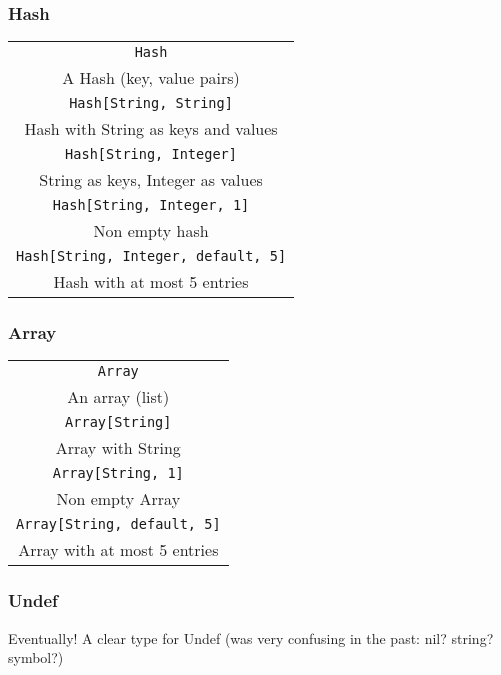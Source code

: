 \begin{frame}\frametitle{Hash}
    \begin{table}
        \begin{tabular}{c}
\texttt{Hash} \\ A Hash (key, value pairs)
\vspace{4mm} \\\pause
            \texttt{Hash[String, String]} \\ Hash with String as keys and values
\vspace{4mm} \\\pause
            \texttt{Hash[String, Integer]} \\ String as keys, Integer as values
\vspace{4mm} \\\pause
            \texttt{Hash[String, Integer, 1]} \\ Non empty hash
\vspace{4mm} \\\pause
            \texttt{Hash[String, Integer, default, 5]} \\ Hash with at most 5 entries
\end{tabular}
    \end{table}
\end{frame}
\begin{frame}\frametitle{Array}
    \begin{table}
        \begin{tabular}{c}
            \texttt{Array} \\ An array (list)
\vspace{4mm} \\\pause
            \texttt{Array[String]} \\ Array with String
\vspace{4mm} \\\pause
            \texttt{Array[String, 1]} \\ Non empty Array
\vspace{4mm} \\\pause
            \texttt{Array[String, default, 5]} \\ Array with at most 5 entries
\end{tabular}
    \end{table}
\end{frame}
\begin{frame}\frametitle{Undef}
    \begin{center}
        \LARGE
        Eventually! A clear type for Undef (was very confusing in the past: nil? string? symbol?)
    \end{center}
\end{frame}
